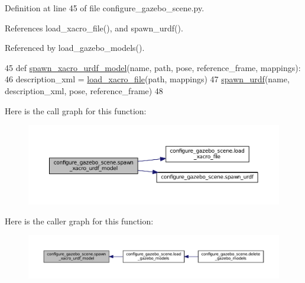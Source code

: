 Definition at line 45 of file configure\+\_\+gazebo\+\_\+scene.\+py.



References load\+\_\+xacro\+\_\+file(), and spawn\+\_\+urdf().



Referenced by load\+\_\+gazebo\+\_\+models().


\begin{DoxyCode}
45 \textcolor{keyword}{def }\hyperlink{namespaceconfigure__gazebo__scene_ab316a0c48017b0f2f926f3bdcb3563bf}{spawn\_xacro\_urdf\_model}(name, path, pose, reference\_frame, mappings):
46     description\_xml = \hyperlink{namespaceconfigure__gazebo__scene_a9e2008c04a5ca68232c2e385d776d9f8}{load\_xacro\_file}(path, mappings)
47     \hyperlink{namespaceconfigure__gazebo__scene_a7889d32e94d3772a954ef4e6159d97e1}{spawn\_urdf}(name, description\_xml, pose, reference\_frame)
48 
\end{DoxyCode}


Here is the call graph for this function\+:
\nopagebreak
\begin{figure}[H]
\begin{center}
\leavevmode
\includegraphics[width=350pt]{namespaceconfigure__gazebo__scene_ab316a0c48017b0f2f926f3bdcb3563bf_cgraph}
\end{center}
\end{figure}




Here is the caller graph for this function\+:
\nopagebreak
\begin{figure}[H]
\begin{center}
\leavevmode
\includegraphics[width=350pt]{namespaceconfigure__gazebo__scene_ab316a0c48017b0f2f926f3bdcb3563bf_icgraph}
\end{center}
\end{figure}




